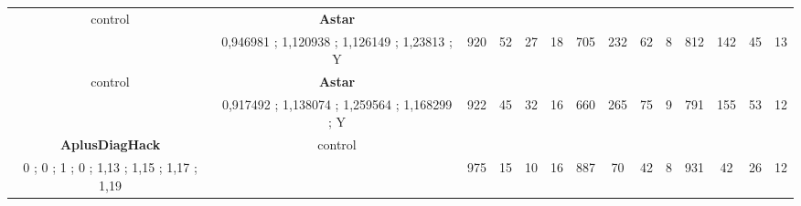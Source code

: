 \begin{table}[H]
{\begin{tabular}{|c|c|c|c|c|c|c|c|c|c|c|c|c|c|}
control & \cellcolor{blue!15}\textbf{Astar}& {\color[HTML]{00009B} } & {\color[HTML]{9A0000} } & {\color[HTML]{009901} } &  & {\color[HTML]{00009B} } & {\color[HTML]{9A0000} } & {\color[HTML]{009901} } &  & {\color[HTML]{00009B} } & {\color[HTML]{9A0000} } & {\color[HTML]{009901} } &  \\ 
 & \cellcolor{ blue!15}0,946981 ; 1,120938 ; 1,126149 ; 1,23813 ; Y & \multirow{-2}{*}{{\color[HTML]{00009B} 920}} & \multirow{-2}{*}{{\color[HTML]{9A0000} 52}} & \multirow{-2}{*}{{\color[HTML]{009901} 27}} & \multirow{-2}{*}{18} & \multirow{-2}{*}{{\color[HTML]{00009B} 705}} & \multirow{-2}{*}{{\color[HTML]{9A0000} 232}} & \multirow{-2}{*}{{\color[HTML]{009901} 62}} & \multirow{-2}{*}{8} & \multirow{-2}{*}{{\color[HTML]{00009B} 812}} & \multirow{-2}{*}{{\color[HTML]{9A0000} 142}} & \multirow{-2}{*}{{\color[HTML]{009901} 45}} & \multirow{-2}{*}{13} \\ \hline

control & \cellcolor{blue!15}\textbf{Astar}& {\color[HTML]{00009B} } & {\color[HTML]{9A0000} } & {\color[HTML]{009901} } &  & {\color[HTML]{00009B} } & {\color[HTML]{9A0000} } & {\color[HTML]{009901} } &  & {\color[HTML]{00009B} } & {\color[HTML]{9A0000} } & {\color[HTML]{009901} } &  \\ 
 & \cellcolor{ blue!15}0,917492 ; 1,138074 ; 1,259564 ; 1,168299 ; Y & \multirow{-2}{*}{{\color[HTML]{00009B} 922}} & \multirow{-2}{*}{{\color[HTML]{9A0000} 45}} & \multirow{-2}{*}{{\color[HTML]{009901} 32}} & \multirow{-2}{*}{16} & \multirow{-2}{*}{{\color[HTML]{00009B} 660}} & \multirow{-2}{*}{{\color[HTML]{9A0000} 265}} & \multirow{-2}{*}{{\color[HTML]{009901} 75}} & \multirow{-2}{*}{9} & \multirow{-2}{*}{{\color[HTML]{00009B} 791}} & \multirow{-2}{*}{{\color[HTML]{9A0000} 155}} & \multirow{-2}{*}{{\color[HTML]{009901} 53}} & \multirow{-2}{*}{12} \\ \hline


\cellcolor{blue!15}\textbf{AplusDiagHack} & control& {\color[HTML]{00009B} } & {\color[HTML]{9A0000} } & {\color[HTML]{009901} } &  & {\color[HTML]{00009B} } & {\color[HTML]{9A0000} } & {\color[HTML]{009901} } &  & {\color[HTML]{00009B} } & {\color[HTML]{9A0000} } & {\color[HTML]{009901} } &  \\ 
\cellcolor{ blue!15}0 ; 0 ; 1 ; 0 ; 1,13 ; 1,15 ; 1,17 ; 1,19 &  & \multirow{-2}{*}{{\color[HTML]{00009B} 975}} & \multirow{-2}{*}{{\color[HTML]{9A0000} 15}} & \multirow{-2}{*}{{\color[HTML]{009901} 10}} & \multirow{-2}{*}{16} & \multirow{-2}{*}{{\color[HTML]{00009B} 887}} & \multirow{-2}{*}{{\color[HTML]{9A0000} 70}} & \multirow{-2}{*}{{\color[HTML]{009901} 42}} & \multirow{-2}{*}{8} & \multirow{-2}{*}{{\color[HTML]{00009B} 931}} & \multirow{-2}{*}{{\color[HTML]{9A0000} 42}} & \multirow{-2}{*}{{\color[HTML]{009901} 26}} & \multirow{-2}{*}{12} \\ \hline


\end{tabular}}
\end{table}
